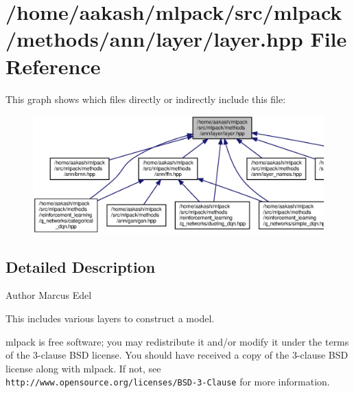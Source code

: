 \section{/home/aakash/mlpack/src/mlpack/methods/ann/layer/layer.hpp File Reference}
\label{layer_8hpp}
This graph shows which files directly or indirectly include this file\+:
\nopagebreak
\begin{figure}[H]
\begin{center}
\leavevmode
\includegraphics[width=350pt]{layer_8hpp__dep__incl}
\end{center}
\end{figure}


\subsection{Detailed Description}
\begin{DoxyAuthor}{Author}
Marcus Edel
\end{DoxyAuthor}
This includes various layers to construct a model.

mlpack is free software; you may redistribute it and/or modify it under the terms of the 3-\/clause B\+SD license. You should have received a copy of the 3-\/clause B\+SD license along with mlpack. If not, see {\tt http\+://www.\+opensource.\+org/licenses/\+B\+S\+D-\/3-\/\+Clause} for more information. 
